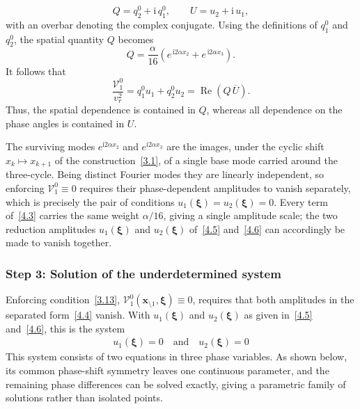 \documentclass[11pt]{jfm}
\numberwithin{equation}{section}
\begin{document}
\[
Q=q_2^0+\mathrm{i}\,q_1^0,
\qquad
U=u_2+\mathrm{i}\,u_1 ,
\]
with an overbar denoting the complex conjugate.
Using the definitions of $q_1^0$ and $q_2^0$, the spatial quantity $Q$ becomes
\[
Q=\frac{\alpha}{16}\left(e^{\,\mathrm{i}2\alpha x_2}+e^{\,\mathrm{i}2\alpha x_3}\right).
\]
It follows that
\[
\frac{\mathcal{V}_1^0}{v_r^2}=q_1^0u_1+q_2^0u_2
=\operatorname{Re}\!\left(Q\,\overline{U}\right).
\]
Thus, the spatial dependence is contained in $Q$, whereas all dependence on the phase angles is contained in $U$.

The surviving modes $e^{\mathrm{i}2\alpha x_2}$ and $e^{\mathrm{i}2\alpha x_3}$ are the images,
under the cyclic shift $x_k\mapsto x_{k+1}$ of the construction~\eqref{3.1}, of a single base mode
carried around the three-cycle. Being distinct Fourier modes they are linearly independent, so
enforcing $\mathcal{V}_1^0\equiv0$ requires their phase-dependent amplitudes to vanish separately,
which is precisely the pair of conditions $u_1(\boldsymbol{\xi})=u_2(\boldsymbol{\xi})=0$. Every term of~\eqref{4.3} carries the same weight $\alpha/16$, giving a single
amplitude scale; the two reduction amplitudes $u_1(\boldsymbol{\xi})$ and $u_2(\boldsymbol{\xi})$
of~\eqref{4.5} and~\eqref{4.6} can accordingly be made to vanish together.
\subsubsection{Step 3: Solution of the underdetermined system}

Enforcing condition~\eqref{3.13}, $\mathcal{V}_1^0(\boldsymbol{x}_{\setminus 1}, \boldsymbol{\xi}) \equiv 0$, requires that both amplitudes in the separated form~\eqref{4.4} vanish. With $u_1(\boldsymbol{\xi})$ and $u_2(\boldsymbol{\xi})$ as given in~\eqref{4.5} and~\eqref{4.6}, this is the system
\begin{eqnarray}
\label{4.7}
u_1(\boldsymbol{\xi}) = 0\quad\text{and} \quad u_2(\boldsymbol{\xi})= 0
\end{eqnarray}
This system consists of two equations in three phase variables. As shown below, its common
phase-shift symmetry leaves one continuous parameter, and the remaining phase differences can be
solved exactly, giving a parametric family of solutions rather than isolated points.
\end{document}
